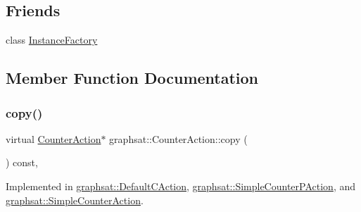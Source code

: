 \subsection*{Friends}
\begin{DoxyCompactItemize}
\item 
class \mbox{\hyperlink{classgraphsat_1_1_counter_action_ad4b3c25c041701ae56dc1e78df779d2f}{Instance\+Factory}}
\end{DoxyCompactItemize}


\subsection{Member Function Documentation}
\mbox{\label{classgraphsat_1_1_counter_action_aa6ab6ebd8e13b466dba062efea962691}} 
\subsubsection{\texorpdfstring{copy()}{copy()}}
{\footnotesize\ttfamily virtual \mbox{\hyperlink{classgraphsat_1_1_counter_action}{Counter\+Action}}$\ast$ graphsat\+::\+Counter\+Action\+::copy (\begin{DoxyParamCaption}{ }\end{DoxyParamCaption}) const\hspace{0.3cm}{\ttfamily [private]}, {}}



Implemented in \mbox{\hyperlink{classgraphsat_1_1_default_c_action_a69fa305cacc678c4435bad7a101302aa}{graphsat\+::\+Default\+C\+Action}}, \mbox{\hyperlink{classgraphsat_1_1_simple_counter_p_action_ad7a689c0bc048013e29ea4a9c77e7779}{graphsat\+::\+Simple\+Counter\+P\+Action}}, and \mbox{\hyperlink{classgraphsat_1_1_simple_counter_action_ad84a740a65e18a992f10a606d7f74973}{graphsat\+::\+Simple\+Counter\+Action}}.

